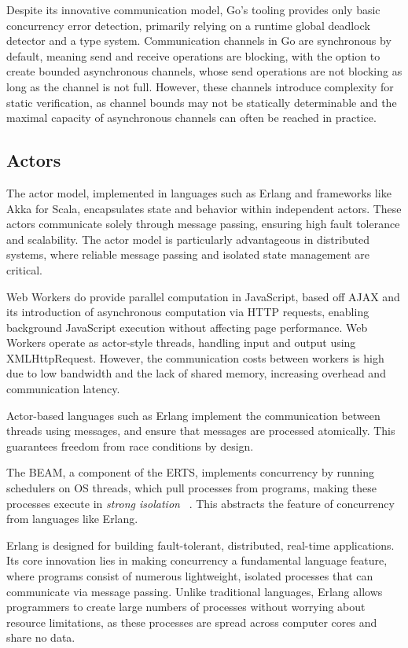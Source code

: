 \documentclass[]{project_interim}
\begin{document}
Despite its innovative communication model, Go's tooling provides only basic
concurrency error detection, primarily relying on a runtime global deadlock
detector and a type system. Communication channels
in Go are synchronous by default, meaning send and receive operations are
blocking, with the option to create bounded asynchronous channels, whose
send operations are not blocking as long as the channel
is not full. \cite{lange_empirical_2019} However, these channels
introduce complexity for static verification, as channel bounds may not be
statically determinable and the maximal capacity of
asynchronous channels can often be reached in practice.\cite{lange_empirical_2019}

\subsection{Actors}
The actor model, implemented in languages such as Erlang and frameworks
like Akka for Scala, encapsulates state and behavior within independent actors.
These actors communicate solely through message passing, ensuring high fault
tolerance and scalability. The actor model is particularly advantageous in
distributed systems, where reliable message passing and isolated state
management are critical.

Web Workers do provide parallel computation in JavaScript, based off AJAX and its
introduction of asynchronous computation via HTTP requests, enabling background
JavaScript execution without affecting page performance. Web Workers operate as
actor-style threads, handling input and output using
XMLHttpRequest. However, the communication costs between workers
is high due to low bandwidth and the lack of shared memory,
increasing overhead and communication latency.\cite{namiot_js_2015}

Actor-based languages such as Erlang
implement the communication between threads
using messages, and ensure that messages are processed
atomically. This guarantees freedom from race conditions
by design.\cite{bianchi_survey_2018}

The BEAM, a component of the ERTS, implements concurrency by running schedulers
on OS threads, which pull processes from programs, making these processes execute in
\textit{strong isolation} ~\cite{stenman_erlang_2024, armstrong_making_2003, debenedetto_elixir_2019}.
This abstracts the feature of concurrency from languages like Erlang.

Erlang is designed for building fault-tolerant, distributed, real-time
applications. Its core innovation lies in making concurrency a fundamental
language feature, where programs consist of numerous lightweight,
isolated processes that can communicate via message passing.
Unlike traditional languages, Erlang allows programmers to
create large numbers of processes without worrying about resource limitations,
as these processes are spread across computer cores and share no data.\cite{armstrong_erlang_2010}
\end{document}
